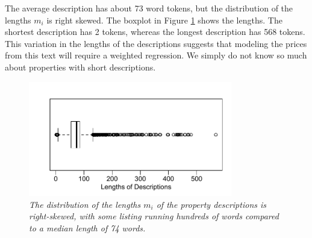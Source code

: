 \documentclass[12pt]{article}
\begin{document}
 The average description has about 73 word tokens, but the distribution of the
 lengths $m_i$ is right skewed.  The boxplot in Figure \ref{fig:boxplot} shows
 the lengths.  The shortest description has 2 tokens, whereas the longest
 description has 568 tokens.  This variation in the lengths of the descriptions
 suggests that modeling the prices from this text will require a weighted
 regression.  We simply do not know so much about  properties with short
 descriptions.


 \begin{figure}
 \caption{ \label{fig:boxplot} { \sl The distribution of the lengths $m_i$ of
the property descriptions is right-skewed, with some listing running hundreds of
words compared to a median length of 74 words. } }

 \centerline{
 \vspace{0.1in}
 \includegraphics[width=3.5in]{figures/boxplot} }
 \vspace{0.2in}
 \end{figure}
\end{document}
